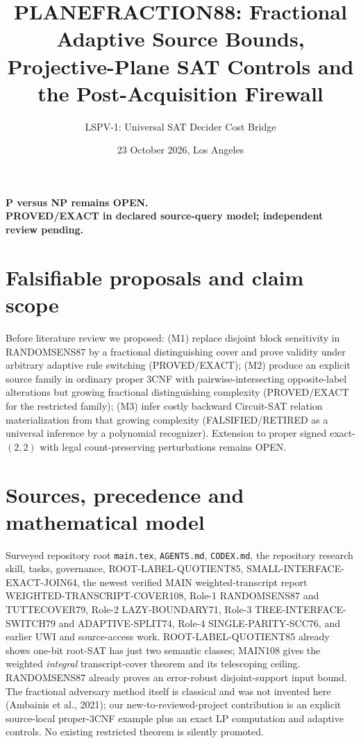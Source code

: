 \documentclass[11pt]{article}
\title{PLANEFRACTION88: Fractional Adaptive Source Bounds, Projective-Plane SAT Controls and the Post-Acquisition Firewall}
\author{LSPV-1: Universal SAT Decider Cost Bridge}
\date{23 October 2026, Los Angeles}
\begin{document}
\maketitle
\begin{center}\textbf{P versus NP remains OPEN.}\\
\textbf{PROVED/EXACT in declared source-query model; independent review pending.}\end{center}

\section{Falsifiable proposals and claim scope}
Before literature review we proposed: (M1) replace disjoint block sensitivity in RANDOMSENS87 by a fractional distinguishing cover and prove validity under arbitrary adaptive rule switching (PROVED/EXACT); (M2) produce an explicit source family in ordinary proper 3CNF with pairwise-intersecting opposite-label alterations but growing fractional distinguishing complexity (PROVED/EXACT for the restricted family); (M3) infer costly backward Circuit-SAT relation materialization from that growing complexity (FALSIFIED/RETIRED as a universal inference by a polynomial recognizer). Extension to proper signed exact-$(2,2)$ with legal count-preserving perturbations remains OPEN.

\section{Sources, precedence and mathematical model}
Surveyed repository root \texttt{main.tex}, \texttt{AGENTS.md}, \texttt{CODEX.md}, the repository research skill, tasks, governance, ROOT-LABEL-QUOTIENT85, SMALL-INTERFACE-EXACT-JOIN64, the newest verified MAIN weighted-transcript report WEIGHTED-TRANSCRIPT-COVER108, Role-1 RANDOMSENS87 and TUTTECOVER79, Role-2 LAZY-BOUNDARY71, Role-3 TREE-INTERFACE-SWITCH79 and ADAPTIVE-SPLIT74, Role-4 SINGLE-PARITY-SCC76, and earlier UWI and source-access work. ROOT-LABEL-QUOTIENT85 already shows one-bit root-SAT has just two semantic classes; MAIN108 gives the weighted \emph{integral} transcript-cover theorem and its telescoping ceiling. RANDOMSENS87 already proves an error-robust disjoint-support input bound. The fractional adversary method itself is classical and was not invented here (Ambainis et al., 2021); our new-to-reviewed-project contribution is an explicit source-local proper-3CNF example plus an exact LP computation and adaptive controls. No existing restricted theorem is silently promoted.
\end{document}
